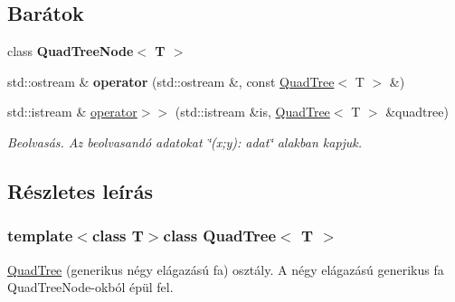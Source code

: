 \subsection*{Barátok}
\begin{DoxyCompactItemize}
\item 
\hypertarget{class_quad_tree_ac17a5caf43217c772028859f0dd9036e}{class {\bfseries Quad\-Tree\-Node$<$ T $>$}}\label{class_quad_tree_ac17a5caf43217c772028859f0dd9036e}

\item 
\hypertarget{class_quad_tree_a1064006fe4acbdff14ffa84b3a22e774}{std\-::ostream \& {\bfseries operator} (std\-::ostream \&, const \hyperlink{class_quad_tree}{Quad\-Tree}$<$ T $>$ \&)}\label{class_quad_tree_a1064006fe4acbdff14ffa84b3a22e774}

\item 
\hypertarget{class_quad_tree_a60cfb0948b744f2d7ba51d75ad8f28ea}{std\-::istream \& \hyperlink{class_quad_tree_a60cfb0948b744f2d7ba51d75ad8f28ea}{operator$>$$>$} (std\-::istream \&is, \hyperlink{class_quad_tree}{Quad\-Tree}$<$ T $>$ \&quadtree)}\label{class_quad_tree_a60cfb0948b744f2d7ba51d75ad8f28ea}

\begin{DoxyCompactList}\small\item\em Beolvasás. Az beolvasandó adatokat \char`\"{}(x;y)\-: adat\char`\"{} alakban kapjuk. \end{DoxyCompactList}\end{DoxyCompactItemize}


\subsection{Részletes leírás}
\subsubsection*{template$<$class T$>$class Quad\-Tree$<$ T $>$}

\hyperlink{class_quad_tree}{Quad\-Tree} (generikus négy elágazású fa) osztály. A négy elágazású generikus fa Quad\-Tree\-Node-\/okból épül fel. 

